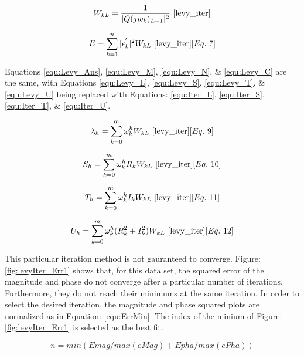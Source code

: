 \begin{equation}
    \label{equ:iter_Weight}
    W_{kL} = \frac{1}{|Q(jw_k)_{L-1}|^2}
    ~\cite{levy_iter}
\end{equation}

\begin{equation}
    \label{equ:iter_Err}
    E = \sum_{k=1}^{n} |\epsilon _k ^{'}|^2W_{kL}
    ~\cite{levy_iter}[Eq.~7]
\end{equation}

Equations \eqref{equ:Levy_Ans}, \eqref{equ:Levy_M}, \eqref{equ:Levy_N}, \& \eqref{equ:Levy_C} are the same, with Equations \eqref{equ:Levy_L}, \eqref{equ:Levy_S}, \eqref{equ:Levy_T}, \& \eqref{equ:Levy_U} being replaced with Equations: \eqref{equ:Iter_L}, \eqref{equ:Iter_S}, \eqref{equ:Iter_T}, \& \eqref{equ:Iter_U}.

\begin{equation}
    \label{equ:Iter_L}
    \lambda _h = \sum_{k=0}^{m} \omega _k ^hW_{kL}
    ~\cite{levy_iter}[Eq.~9]
\end{equation}

\begin{equation}
    \label{equ:Iter_S}
    S_h = \sum_{k=0}^{m} \omega _k ^h R_kW_{kL}
    ~\cite{levy_iter}[Eq.~10]
\end{equation}

\begin{equation}
    \label{equ:Iter_T}
    T_h = \sum_{k=0}^{m} \omega _k ^h I_kW_{kL}
    ~\cite{levy_iter}[Eq.~11]
\end{equation}

\begin{equation}
    \label{equ:Iter_U}
    U_h = \sum_{k=0}^{m} \omega _k ^h (R_k ^2 + I_k ^2)W_{kL}
    ~\cite{levy_iter}[Eq.~12]
\end{equation}


This particular iteration method is not gauranteed to converge. Figure: \ref{fig:levyIter_Err1} shows that, for this data set, the squared error of the magnitude and phase do not converge after a particular number of iterations. Furthermore, they do not reach their minimums at the same iteration. In order to select the desired iteration, the magnitude and phase squared plots are normalized as in Equation: \eqref{equ:ErrMin}. The index of the minium of Figure: \ref{fig:levyIter_Err1} is selected as the best fit.

\begin{equation}
\label{equ:ErrMin}
n = min(Emag/max(eMag) + Epha/max(ePha))
\end{equation}

